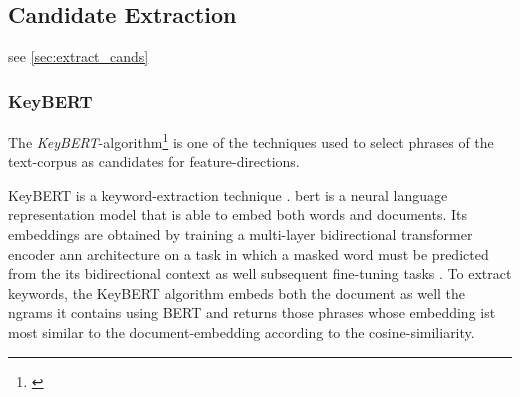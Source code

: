 

\subsection*{Candidate Extraction}

see \autoref{sec:extract_cands}

\subsubsection*{KeyBERT}
\label{ap:details_keybert}

The \emph{KeyBERT}-algorithm\footnote{\label{fnote:keybertgibhut}} \cite{grootendorst2020keybert} is one of the techniques used to select phrases of the text-corpus as candidates for \gls{feature}-directions. 

KeyBERT is a keyword-extraction technique . \Gls{bert} is a neural language representation model that is able to embed both words and documents. Its embeddings are obtained by training a multi-layer bidirectional transformer encoder \gls{ann} architecture on a task in which a masked word must be predicted from the its bidirectional context as well subsequent fine-tuning tasks \cite{Devlin2019}. To extract keywords, the KeyBERT algorithm embeds both the document as well the \glspl{ngram} it contains using BERT and returns those phrases whose embedding ist most similar to the document-embedding according to the cosine-similiarity.

